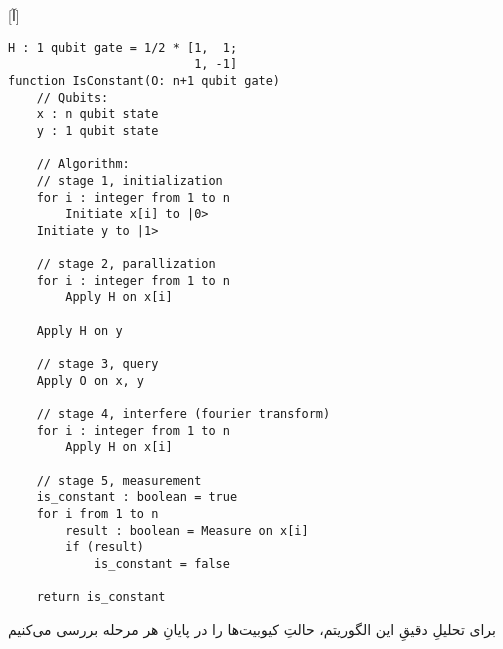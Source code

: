 [آ]
\begin{latin}
\begin{lstlisting}
H : 1 qubit gate = 1/2 * [1,  1;
                          1, -1]
function IsConstant(O: n+1 qubit gate)   
    // Qubits:
    x : n qubit state
    y : 1 qubit state

    // Algorithm:
    // stage 1, initialization
    for i : integer from 1 to n
        Initiate x[i] to |0>
    Initiate y to |1>

    // stage 2, parallization
    for i : integer from 1 to n
        Apply H on x[i]
       
    Apply H on y
        
    // stage 3, query
    Apply O on x, y
    
    // stage 4, interfere (fourier transform)
    for i : integer from 1 to n
        Apply H on x[i]

    // stage 5, measurement
    is_constant : boolean = true
    for i from 1 to n
        result : boolean = Measure on x[i]
        if (result)
            is_constant = false
            
    return is_constant
\end{lstlisting}
\end{latin}

برای تحلیلِ دقیقِ این الگوریتم، حالتِ کیوبیت‌ها را در پایانِ هر مرحله بررسی می‌کنیم

